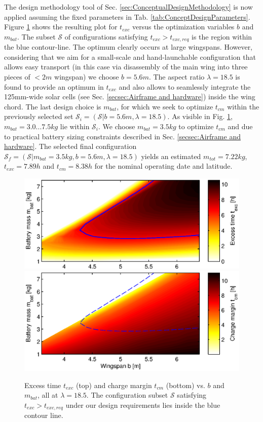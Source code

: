 The design methodology tool of Sec. \ref{sec:ConceptualDesignMethodology} is now applied assuming the fixed parameters in Tab. \ref{tab:ConceptDesignParameters}. Figure \ref{fig:ExcessTimeChargeMargin} shows the resulting plot for $t_{exc}$ versus the optimization variables $b$ and $m_{bat}$. The subset $\mathcal{S}$ of configurations satisfying $t_{exc}>t_{exc,req}$ is the region within the blue contour-line. The optimum clearly occurs at large wingspans. However, considering that we aim for a small-scale and hand-launchable configuration that allows easy transport (in this case via disassembly of the main wing into three pieces of $<2m$ wingspan) we choose $b=5.6m$.  The aspect ratio $\lambda=18.5$ is found to provide an optimum in $t_{exc}$ and also allows to seamlessly integrate the 125mm-wide solar cells (see Sec. \ref{secsec:Airframe and hardware}) inside the wing chord. The last design choice is $m_{bat}$, for which we seek to optimize $t_{cm}$ within the previously selected set $\mathcal{S}_i=(\mathcal{S}|b=5.6m, \lambda=18.5)$. As visible in Fig. \ref{fig:ExcessTimeChargeMargin}, $m_{bat}=3.0...7.5kg$ lie within $\mathcal{S}_i$. We choose $m_{bat}=3.5kg$ to optimize $t_{cm}$ and due to practical battery sizing constraints described in Sec. \ref{secsec:Airframe and hardware}. The selected final configuration $\mathcal{S}_f=(\mathcal{S}|m_{bat}=3.5kg, b=5.6m, \lambda=18.5)$ yields an estimated $m_{tot}=7.22kg$, $t_{exc}=7.89h$ and $t_{cm}=8.38h$ for the nominal operating date and latitude.
\begin{figure}[tb]
    \centering
    \includegraphics[width=\linewidth]{images/3_excesstime}
    \includegraphics[width=\linewidth]{images/4_chargemargin}
    \caption{Excess time $t_{exc}$ (top) and charge margin $t_{cm}$ (bottom) vs. $b$ and $m_{bat}$, all at $\lambda=18.5$. The configuration subset $\mathcal{S}$ satisfying $t_{exc}>t_{exc,req}$ under our design requirements lies inside the blue contour line.}
    \label{fig:ExcessTimeChargeMargin}
\end{figure}

